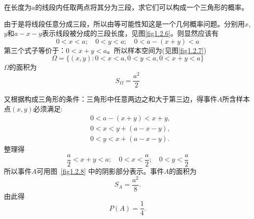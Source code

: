 \begin{example}
    在长度为$a$的线段内任取两点将其分为三段，求它们可以构成一个三角形的概率。
\end{example}

\begin{solution}
    由于是将线段任意分成三段，所以由等可能性知这是一个几何概率问题。分别用$x$,$y$和$a - x - y$表示线段被分成的三段长度，见图\ref{fig1.2.6}。则显然应该有
    \[ 0 < x < a; \quad 0 < y < a; \quad 0 < a - (x + y) < a \]
    第三个式子等价于：$0 < x + y < a$。所以样本空间为(见图\ref{fig1.2.7})
    \[ \Omega = \{(x, y): 0 < x < a, 0 < y < a, 0 < x + y < a\} \]
   $\Omega$的面积为
    \[ S_\Omega = \frac{a^2}{2} \]

    又根据构成三角形的条件：三角形中任意两边之和大于第三边，得事件$A$所含样本点$(x,y)$必须满足:
    \begin{align*}
         & 0 < a - (x + y) < x + y, \\
         & 0 < x < y + (a - x - y), \\
         & 0 < y < x + (a - x - y).
    \end{align*}
    整理得
    \[ \frac{a}{2} < x + y < a;\quad 0 < x < \frac{a}{2}; \quad 0 < y < \frac{a}{2} \]
    所以事件$A$可用图~\ref{fig1.2.8} 中的阴影部分表示。事件$A$的面积为
    \[ S_A = \frac{a^2}{8}. \]
    由此得
    \[P(A) = \frac1{4}. \]
\end{solution}

